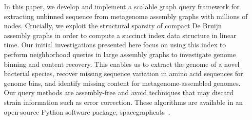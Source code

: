 In this paper, we develop and implement a scalable graph query
framework for extracting unbinned sequence from metagenome assembly
graphs with millions of nodes. Crucially, we exploit the structural
sparsity of compact De Bruijn assembly graphs in order to compute a
succinct index data structure in linear time. Our initial
investigations presented here focus on using this index to perform
neighborhood queries in large assembly graphs to investigate genome
binning and content recovery.  This enables us to extract the genome
of a novel bacterial species, recover missing sequence variation in
amino acid sequences for genome bins, and identify missing content for
metagenome-assembled genomes.  Our query methods are assembly-free and
avoid techniques that may discard strain information such as error
correction.  These algorithms are available in an open-source Python
software package,
\textsf{spacegraphcats}~\cite{spacegraphcats}.

